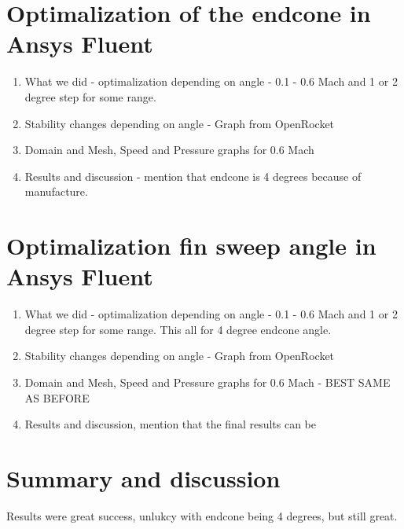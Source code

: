 \documentclass{article}
\begin{document}
\section{Optimalization of the endcone in Ansys Fluent}
\begin{enumerate}
    \item What we did - optimalization depending on angle - 0.1 - 0.6 Mach and 1 or 2 degree step for some range.
    \item Stability changes depending on angle - Graph from OpenRocket
    \item Domain and Mesh, Speed and Pressure graphs for 0.6 Mach
    \item Results and discussion - mention that endcone is 4 degrees because of manufacture.
\end{enumerate}

\section{Optimalization fin sweep angle in Ansys Fluent}
\begin{enumerate}
    \item What we did - optimalization depending on angle - 0.1 - 0.6 Mach and 1 or 2 degree step for some range. 
    This all for 4 degree endcone angle.
    \item Stability changes depending on angle - Graph from OpenRocket
    \item Domain and Mesh, Speed and Pressure graphs for 0.6 Mach - BEST SAME AS BEFORE
    \item Results and discussion, mention that the final results can be 
\end{enumerate}

\section{Summary and discussion}
Results were great success, unlukcy with endcone being 4 degrees, but still great.
\end{document}
